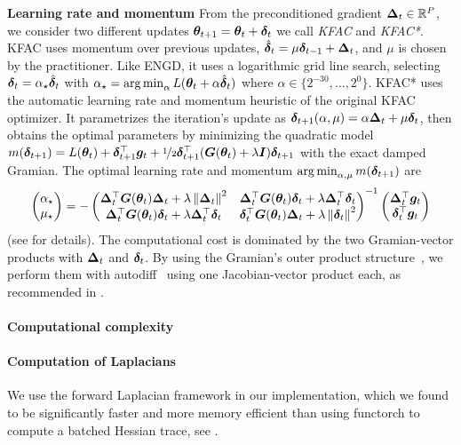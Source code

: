 \textbf{Learning rate and momentum} From the preconditioned gradient ${\bm{\Delta}}_t \in {\mathbb{R}}^P$, we consider two different updates $ {\bm{\theta}}_{t+1} = {\bm{\theta}}_t + {\bm{\delta}}_{t}$ we call \emph{KFAC} and \emph{KFAC*}.
KFAC uses momentum over previous updates, $\hat{{\bm{\delta}}}_t = \mu {\bm{\delta}}_{t-1} + {\bm{\Delta}}_t$, and $\mu$ is chosen by the practitioner.
Like ENGD, it uses a logarithmic grid line search, selecting ${\bm{\delta}}_t = \alpha_{\star} \hat{{\bm{\delta}}}_t$ with $\alpha_{\star} = \operatorname*{arg\,min}_{\alpha} L({\bm{\theta}}_t + \alpha \hat{{\bm{\delta}}}_t)$ where $\alpha \in \{2^{-30}, \dots, 2^0\}$.
KFAC* uses the automatic learning rate and momentum heuristic of the original KFAC optimizer.
It parametrizes the iteration's update as ${\bm{\delta}}_{t+1}(\alpha, \mu) = \alpha {\bm{\Delta}}_t + \mu {\bm{\delta}}_t$, then obtains the optimal parameters by minimizing the quadratic model $m({\bm{\delta}}_{t+1}) = L({\bm{\theta}}_t) + {\bm{\delta}}_{t+1}^{\top} {\bm{g}}_t + \nicefrac{1}{2}{\bm{\delta}}_{t+1}^{\top} ({\bm{G}}({\bm{\theta}}_t) + \lambda {\bm{I}}) {\bm{\delta}}_{t+1}$ with the exact damped Gramian.
The optimal learning rate and momentum $\operatorname*{arg\,min}_{\alpha, \mu} m({\bm{\delta}}_{t+1})$ are
\begin{align*}
  \begin{pmatrix}
    \alpha_{\star} \\ \mu_{\star}
  \end{pmatrix}
  =
  -
  \begin{pmatrix}
    {\bm{\Delta}}_t^{\top} {\bm{G}}({\bm{\theta}}_t) {\bm{\Delta}}_t + \lambda \left\lVert {\bm{\Delta}}_t \right\rVert^2
    & {\bm{\Delta}}_t^{\top} {\bm{G}}({\bm{\theta}}_t) {\bm{\delta}}_t + \lambda {\bm{\Delta}}^{\top}_t {\bm{\delta}}_t
    \\
    {\bm{\Delta}}_t^{\top} {\bm{G}}({\bm{\theta}}_t) {\bm{\delta}}_t + \lambda {\bm{\Delta}}^{\top}_t {\bm{\delta}}_t
    &
      {\bm{\delta}}_t^{\top} {\bm{G}}({\bm{\theta}}_t) {\bm{\Delta}}_t + \lambda \left\lVert {\bm{\delta}}_t \right\rVert^2
  \end{pmatrix}^{-1}
  \begin{pmatrix}
    {\bm{\Delta}}_t^{\top} {\bm{g}}_t
    \\
    {\bm{\delta}}_t^{\top} {\bm{g}}_t
  \end{pmatrix}
\end{align*}
(see \citep[][Section 7]{martens2015optimizing} for details).
The computational cost is dominated by the two Gramian-vector products with ${\bm{\Delta}}_t$ and ${\bm{\delta}}_t$.
By using the Gramian's outer product structure~\cite{dangel2022vivit,papyan2019measurements}, we perform them with autodiff~\citep{pearlmutter1994fast,schraudolph2002fast} using one Jacobian-vector product each, as recommended in \cite{martens2015optimizing}.


\paragraph{Computational complexity}

\paragraph{Computation of Laplacians }
We use the forward Laplacian framework in our implementation, which we found to be significantly faster and more memory efficient than using \textmd{functorch} to compute a batched Hessian trace, see . 

